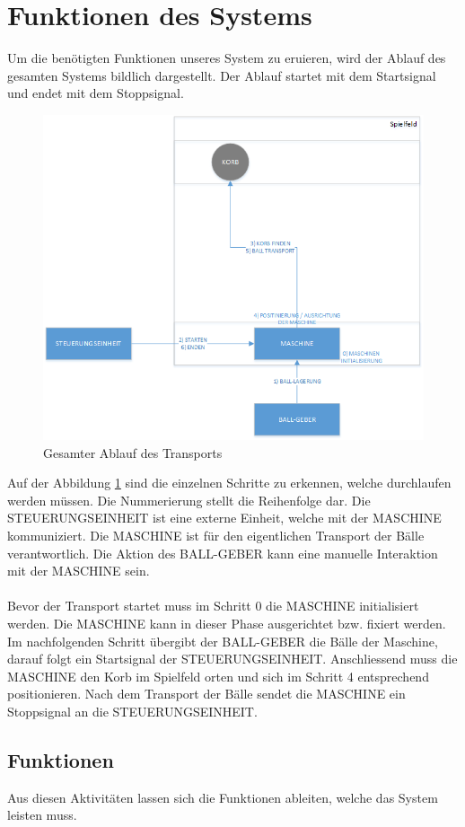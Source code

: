 \section{Funktionen des Systems}
Um die benötigten Funktionen unseres System zu eruieren, wird der Ablauf des gesamten Systems bildlich dargestellt. Der Ablauf startet mit dem Startsignal und endet mit dem Stoppsignal.

\begin{figure}[h!]
\centering
\includegraphics[width=0.7\linewidth]{../../fig/ablauf-transport}
\caption[Gesamter Ablauf des Transports]{Gesamter Ablauf des Transports}
\label{fig:ablauf-transport}
\end{figure}

Auf der Abbildung \ref{fig:ablauf-transport} sind die einzelnen Schritte zu erkennen, welche durchlaufen werden müssen. Die Nummerierung stellt die Reihenfolge dar. Die STEUERUNGSEINHEIT ist eine externe Einheit, welche mit der MASCHINE kommuniziert. Die MASCHINE ist für den eigentlichen Transport der Bälle verantwortlich. Die Aktion des BALL-GEBER kann eine manuelle Interaktion mit der MASCHINE sein.\\
\\
Bevor der Transport startet muss im Schritt 0 die MASCHINE initialisiert werden. Die MASCHINE kann in dieser Phase ausgerichtet bzw. fixiert werden. Im nachfolgenden Schritt übergibt der BALL-GEBER die Bälle der Maschine, darauf folgt ein Startsignal der STEUERUNGSEINHEIT. Anschliessend muss die MASCHINE den Korb im Spielfeld orten und sich im Schritt 4 entsprechend positionieren. Nach dem Transport der Bälle sendet die MASCHINE ein Stoppsignal an die STEUERUNGSEINHEIT.

\subsection{Funktionen}
Aus diesen Aktivitäten lassen sich die Funktionen ableiten, welche das System leisten muss.\\
 
